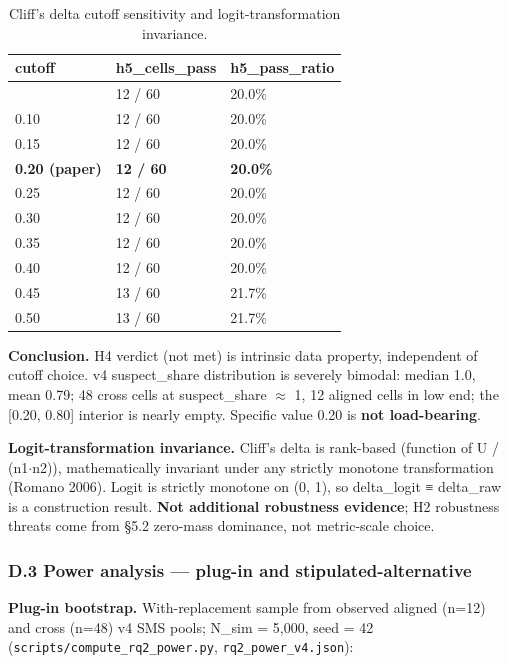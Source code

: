 \documentclass[review,12pt,authoryear]{elsarticle}
\begin{document}
{\def\LTcaptype{table} %
\begin{longtable}[]{@{}lll@{}}
\caption{Cliff's delta cutoff sensitivity and logit-transformation invariance.}\label{tab:p2-22}\\
\toprule\noalign{}
cutoff & h5\_cells\_pass & h5\_pass\_ratio \\
\midrule\noalign{}
\endhead
\bottomrule\noalign{}
\endlastfoot
0.05 & 12 / 60 & 20.0\% \\
0.10 & 12 / 60 & 20.0\% \\
0.15 & 12 / 60 & 20.0\% \\
\textbf{0.20 (paper)} & \textbf{12 / 60} & \textbf{20.0\%} \\
0.25 & 12 / 60 & 20.0\% \\
0.30 & 12 / 60 & 20.0\% \\
0.35 & 12 / 60 & 20.0\% \\
0.40 & 12 / 60 & 20.0\% \\
0.45 & 13 / 60 & 21.7\% \\
0.50 & 13 / 60 & 21.7\% \\
\end{longtable}
}

\textbf{Conclusion.} H4 verdict (not met) is intrinsic data property,
independent of cutoff choice. v4 suspect\_share distribution is severely
bimodal: median 1.0, mean 0.79; 48 cross cells at suspect\_share $\approx$ 1, 12
aligned cells in low end; the {[}0.20, 0.80{]} interior is nearly empty.
Specific value 0.20 is \textbf{not load-bearing}.

\textbf{Logit-transformation invariance.} Cliff's delta is rank-based
(function of U / (n1$\cdot$n2)), mathematically invariant under any strictly
monotone transformation (Romano 2006). Logit is strictly monotone on (0,
1), so delta\_logit ≡ delta\_raw is a construction result. \textbf{Not
additional robustness evidence}; H2 robustness threats come from §5.2
zero-mass dominance, not metric-scale choice.

\subsubsection{D.3 Power analysis --- plug-in and stipulated-alternative}\label{d.3-power-analysis-plug-in-and-stipulated-alternative}

\textbf{Plug-in bootstrap.} With-replacement sample from observed
aligned (n=12) and cross (n=48) v4 SMS pools; N\_sim = 5,000, seed = 42
(\texttt{scripts/compute\_rq2\_power.py}, \texttt{rq2\_power\_v4.json}):
\end{document}
